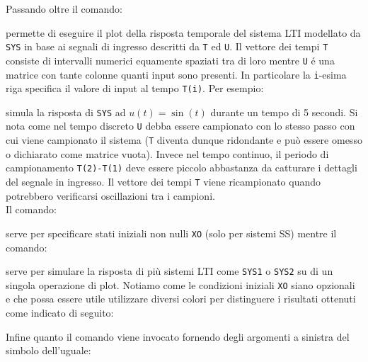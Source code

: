 \documentclass[../main.tex]{subfiles}
\begin{document}


Passando oltre il comando:



permette di eseguire il plot della risposta temporale del sistema LTI modellato da \texttt{SYS} in base ai segnali di ingresso descritti da \texttt{T} ed \texttt{U}. Il vettore dei tempi \texttt{T} consiste di intervalli numerici equamente spaziati tra di loro mentre \texttt{U} é una matrice con tante colonne quanti input sono presenti. In particolare la \texttt{i}-esima riga specifica il valore di input al tempo \texttt{T(i)}. Per esempio:

 

simula la risposta di \texttt{SYS} ad $u(t) = \sin(t)$ durante un tempo di 5 secondi.
Si nota come nel tempo discreto \texttt{U} debba essere campionato con lo stesso passo con cui viene campionato il sistema (\texttt{T} diventa dunque ridondante e può essere omesso o dichiarato come matrice vuota).
Invece nel tempo continuo, il periodo di campionamento \texttt{T(2)-T(1)} deve essere piccolo abbastanza da catturare i dettagli del segnale in ingresso. Il vettore dei tempi \texttt{T} viene ricampionato quando potrebbero verificarsi oscillazioni tra i campioni.\\

Il comando:

 
 
 serve per specificare stati iniziali non nulli \texttt{XO} (solo per sistemi SS) mentre il comando:
 
 

serve per simulare la risposta di più sistemi LTI come \texttt{SYS1} o \texttt{SYS2} su di un singola operazione di plot. 
Notiamo come le condizioni iniziali \texttt{XO} siano opzionali e che possa essere utile utilizzare diversi colori per distinguere i risultati ottenuti come indicato di seguito:




Infine quanto il comando viene invocato fornendo degli argomenti a sinistra del simbolo dell'uguale:
\end{document}
